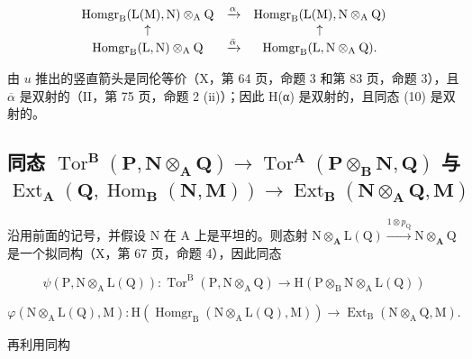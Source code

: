 \[
\begin{array}{c c c} \operatorname{Homgr} _ {\mathrm{B}} (\mathrm{L} (\mathrm{M}), \mathrm{N}) \otimes_ {\mathrm{A}} \mathrm{Q} & \xrightarrow {\alpha} & \operatorname{Homgr} _ {\mathrm{B}} (\mathrm{L} (\mathrm{M}), \mathrm{N} \otimes_ {\mathrm{A}} \mathrm{Q}) \\ \uparrow & & \uparrow \\ \operatorname{Homgr} _ {\mathrm{B}} (\mathrm{L}, \mathrm{N}) \otimes_ {\mathrm{A}} \mathrm{Q} & \xrightarrow {\bar {\alpha}} & \operatorname{Homgr} _ {\mathrm{B}} (\mathrm{L}, \mathrm{N} \otimes_ {\mathrm{A}} \mathrm{Q}). \end{array}
\]

由 \(u\) 推出的竖直箭头是同伦等价（X，第 64 页，命题 3 和第 83 页，命题 3），且 \(\overline{\alpha}\) 是双射的（II，第 75 页，命题 2 (ii)）；因此 H(α) 是双射的，且同态 (10) 是双射的。

\subsection{\texorpdfstring{同态 \(\operatorname{Tor}^{\mathbf{B}}(\mathbf{P},\mathbf{N}\otimes_{\mathbf{A}}\mathbf{Q})\to \operatorname{Tor}^{\mathbf{A}}(\mathbf{P}\otimes_{\mathbf{B}}\mathbf{N},\mathbf{Q})\) 与 \(\operatorname{Ext}_{\mathbf{A}}(\mathbf{Q},\operatorname{Hom}_{\mathbf{B}}(\mathbf{N},\mathbf{M}))\to \operatorname{Ext}_{\mathbf{B}}(\mathbf{N}\otimes_{\mathbf{A}}\mathbf{Q},\mathbf{M})\)}{Tor 与 Ext 的换环同态}}

沿用前面的记号，并假设 N 在 A 上是平坦的。则态射 \(\mathrm{N}\otimes_{\mathbf{A}}\mathrm{L}(\mathrm{Q})\xrightarrow{\mathrm{1}\otimes p_{\mathrm{Q}}} \mathrm{N}\otimes_{\mathbf{A}}\mathrm{Q}\) 是一个拟同构（X，第 67 页，命题 4），因此同态

\[
\psi (\mathrm{P}, \mathrm{N} \otimes_ {\mathrm{A}} \mathrm{L} (\mathrm{Q})): \operatorname{Tor} ^ {\mathrm{B}} (\mathrm{P}, \mathrm{N} \otimes_ {\mathrm{A}} \mathrm{Q}) \rightarrow \mathrm{H} (\mathrm{P} \otimes_ {\mathrm{B}} \mathrm{N} \otimes_ {\mathrm{A}} \mathrm{L} (\mathrm{Q}))
\]

\[
\varphi (\mathrm{N} \otimes_ {\mathrm{A}} \mathrm{L} (\mathrm{Q}), \mathrm{M}): \mathrm{H} (\operatorname{Homgr} _ {\mathrm{B}} (\mathrm{N} \otimes_ {\mathrm{A}} \mathrm{L} (\mathrm{Q}), \mathrm{M})) \rightarrow \operatorname{Ext} _ {\mathrm{B}} (\mathrm{N} \otimes_ {\mathrm{A}} \mathrm{Q}, \mathrm{M}).
\]

再利用同构

